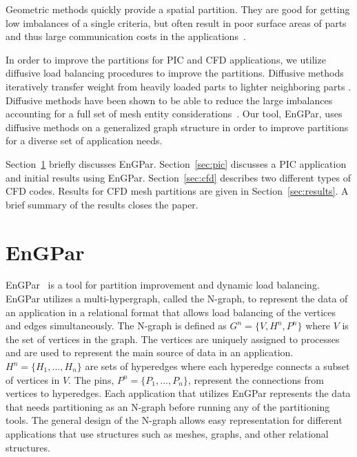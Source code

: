 \documentclass[conference]{IEEEtran}
\begin{document}
Geometric methods quickly provide a spatial partition. They are good for getting low
imbalances of a single criteria, but often result in poor surface areas of parts and thus large
communication costs in the
applications~\cite{devineMultiJagged2015,bergerRib1987}.

In order to improve the partitions for PIC and CFD applications, we utilize diffusive
load balancing procedures to improve the partitions. Diffusive methods iteratively transfer
weight from heavily loaded parts to lighter neighboring parts
\cite{cybenko1989dynamic,subramanian1994analysis}. Diffusive methods have been shown to be
able to reduce the large imbalances accounting for a full set of mesh entity
considerations~\cite{SmithParma2015}. Our tool, EnGPar, uses diffusive methods on a
generalized graph structure in order to improve partitions for a diverse set of application needs.

Section~\ref{sec:engpar} briefly discusses EnGPar.
Section~\ref{sec:pic} discusses a PIC application and initial results
using EnGPar. Section~\ref{sec:cfd} describes two different types of CFD codes. Results for CFD
mesh partitions are given in Section~\ref{sec:results}.
A brief summary of the results closes the paper.

\section{EnGPar} \label{sec:engpar}


EnGPar~\cite{engparSC17,engpar_github} is a tool for partition improvement and
dynamic load balancing.
EnGPar utilizes a multi-hypergraph, called the N-graph, to represent the data of
an application in a relational format that allows load balancing of the vertices
and edges simultaneously.
The N-graph is defined as $G^n = \{V, H^n, P^n\}$ where
$V$ is the set of vertices in the graph. The vertices are uniquely assigned to
processes and are used to represent the main source of data in an application.
$H^n = \{H_1, ..., H_n\}$ are sets of hyperedges where each hyperedge connects a
subset of vertices in $V$. The pins, $P^n = \{P_1,...,P_n\}$, represent the connections from
vertices to hyperedges. Each application that utilizes EnGPar represents the data
that needs partitioning as an N-graph before running any of the partitioning tools.
The general design of the N-graph allows easy representation for different applications
that use structures such as meshes, graphs, and other relational structures.
\end{document}
